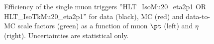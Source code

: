 \begin{figure}[htbp!]
  \begin{center}
      \caption{Efficiency of the single muon triggers ''HLT\_IsoMu20\_eta2p1 OR HLT\_IsoTkMu20\_eta2p1'' for data (black), MC (red) and data-to-MC
        scale factors (green) as a function of muon $\pt$ (left) and $\eta$ (right). Uncertainties are statistical only.}
\label{fig:muonEff_HLT_IsoMu20}
  \end{center}
\end{figure}



